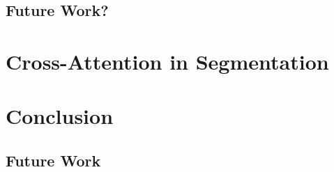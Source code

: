 \documentclass[a4paper,12pt]{report}
\begin{document}
\section{Future Work?}

\chapter{Cross-Attention in Segmentation}


\FloatBarrier


\chapter{Conclusion}
    \section{Future Work}


{}

\end{document}
